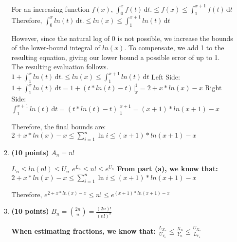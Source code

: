 \documentclass[11pt]{article}
\begin{document}
\begin{enumerate}
\begin{enumerate}
{      For an increasing function $f(x)$, \newline
      $\int_0^x \! f(t) \, \mathrm{d}t. \leq f(x) \leq \int_1^{x+1} \! f(t) \, \mathrm{d}t$ \newline
      \newline
      Therefore, \newline
      $\int_0^x \! ln(t) \, \mathrm{d}t. \leq ln(x) \leq \int_1^{x+1} \! ln(t) \, \mathrm{d}t$ \newline
      \newline

      However, since the natural log of 0 is not possible, we increase the bounds of the lower-bound integral of $ln(x)$. To compensate, we add 1 to the resulting equation, giving our lower bound a possible error of up to 1. The resulting evaluation follows. \newline
      $1 + \int_1^x \! ln(t) \, \mathrm{d}t. \leq ln(x) \leq \int_1^{x+1} \! ln(t) \, \mathrm{d}t$ \newline
      Left Side:
      $1 + \int_1^x \! ln(t) \, \mathrm{d}t = 1 + (t*ln(t) - t)\Big|_x^1 = 2 + x*ln(x) - x$ \newline
      Right Side:
      $\int_1^{x+1} \! ln(t) \, \mathrm{d}t = (t*ln(t) - t)\Big|_1^{x+1} = (x+1)*ln(x+1) - x$ \newline
      \newline

      Therefore, the final bounds are: \newline
      $2 + x*ln(x) - x \leq \sum_{i=1}^n \ln i \leq (x+1)*ln(x+1) - x$
    }
   \newpage
  \item {\bfseries (10 points)} $A_n = n!$  \newline
    {\bfseries
      \newline
      \newline
      $L_n \leq ln(n!) \leq U_n$ \newline
      $e^{L_n} \leq n! \leq e^{U_n}$ \newline
      \newline
      From part (a), we know that: \newline
      $2 + x*ln(x) - x \leq \sum_{i=1}^n \ln i \leq (x+1)*ln(x+1) - x$ \newline
      \newline

      Therefore, \newline
      $e^{2 + x*ln(x) - x} \leq n! \leq e^{(x+1)*ln(x+1) - x}$ \newline
    }
   \newpage
  \item {\bfseries (10 points)} $B_n =\binom{2n}{n} = \frac{(2n)!}{(n!)^2}$ \newline
    {\bfseries
      \newline
      \newline
      When estimating fractions, we know that: \newline
      $\frac{L_{X_n}}{U_{Y_n}} \leq \frac{X_n}{Y_n} \leq \frac{U_{X_n}}{L_{Y_n}}$ \newline
      \newline

}
\end{enumerate}
\end{enumerate}
\end{document}
